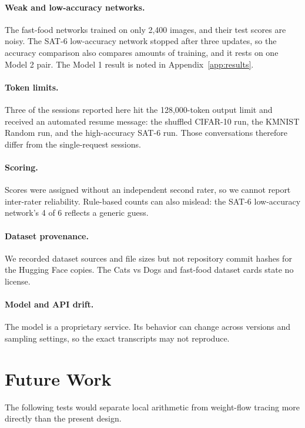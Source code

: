 \documentclass[11pt]{article}
\begin{document}
\paragraph{Weak and low-accuracy networks.} The fast-food networks trained on only 2,400 images, and their test scores are noisy. The SAT-6 low-accuracy network stopped after three updates, so the accuracy comparison also compares amounts of training, and it rests on one Model 2 pair. The Model 1 result is noted in Appendix~\ref{app:results}.

\paragraph{Token limits.} Three of the sessions reported here hit the 128,000-token output limit and received an automated resume message: the shuffled CIFAR-10 run, the KMNIST Random run, and the high-accuracy SAT-6 run. Those conversations therefore differ from the single-request sessions.

\paragraph{Scoring.} Scores were assigned without an independent second rater, so we cannot report inter-rater reliability. Rule-based counts can also mislead: the SAT-6 low-accuracy network's 4 of 6 reflects a generic guess.

\paragraph{Dataset provenance.} We recorded dataset sources and file sizes but not repository commit hashes for the Hugging Face copies. The Cats vs Dogs and fast-food dataset cards state no license.

\paragraph{Model and API drift.} The model is a proprietary service. Its behavior can change across versions and sampling settings, so the exact transcripts may not reproduce.

\section{Future Work}

The following tests would separate local arithmetic from weight-flow tracing more directly than the present design.
\end{document}
